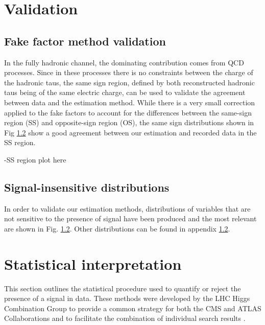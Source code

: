 \section{Validation}

\subsection{Fake factor method validation}

In the fully hadronic channel, the dominating contribution comes from QCD processes. Since in these processes there is no constraints between the charge of the hadronic taus, the same sign region, defined by both reconstructed hadronic taus being of the same electric charge, can be used to validate the agreement between data and the estimation method. While there is a very small correction applied to the fake factors to account for the differences between the same-sign region (SS) and  opposite-sign region (OS), the same sign distributions shown in Fig \ref{} show a good agreement between our estimation and recorded data in the SS region.

-SS region plot here

\subsection{Signal-insensitive distributions}

In order to validate our estimation methods, distributions of variables that are not sensitive to the presence of signal have been produced and the most relevant are shown in Fig. \ref{}. Other distributions can be found in appendix \ref{}.



\section{Statistical interpretation}
\label{sec:analysis_statistical_interpretation}

This section outlines the statistical procedure used to quantify or reject the presence of a signal in data. These methods were developed by the LHC Higgs Combination Group to provide a common strategy for both the CMS and ATLAS Collaborations and to facilitate the combination of individual search results \cite{CMS-NOTE-2011-005}. 

